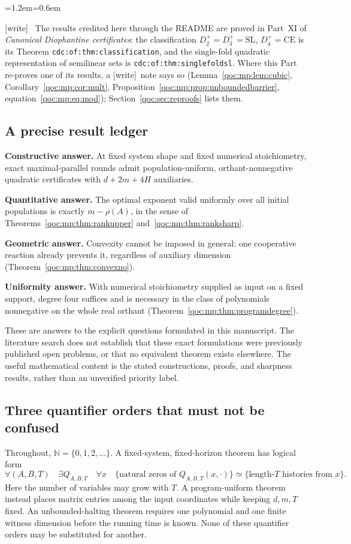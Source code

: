 \documentclass[11pt,letterpaper]{article}
\theoremstyle{definition}
\theoremstyle{remark}
\newcommand{\N}{\mathbb N}
\newcommand{\wtag}{\textup{[write]}}
\newenvironment{writenote}{\par\smallskip\begin{list}{}{\leftmargin=1.2em\rightmargin=0.6em}\item[]\small\wtag\ }{\end{list}\smallskip}
\newcommand{\lab}[1]{\nolinkurl{#1}}
\newcommand{\Dplus}{D^{+}}
\begin{document}
\begin{writenote}
The results credited here through the README are proved in Part~XI of \emph{Canonical Diophantine certificates}: the classification $\Dplus_2=\Dplus_3=\mathrm{SL}$, $\Dplus_4=\mathrm{CE}$ is its Theorem \lab{cdc:of:thm:classification}, and the single-fold quadratic representation of semilinear sets is \lab{cdc:of:thm:singlefoldsl}. Where this Part re-proves one of its results, a \wtag\ note says so (Lemma~\ref{qoc:mp:lem:cubic}, Corollary~\ref{qoc:mp:cor:mult}, Proposition~\ref{qoc:mp:prop:unboundedbarrier}, equation~\eqref{qoc:mp:eq:mod}); Section~\ref{qoc:sec:reproofs} lists them.
\end{writenote}

\subsection{A precise result ledger}
\begin{resultbox}
\textbf{Constructive answer.} At fixed system shape and fixed numerical
stoichiometry, exact maximal-parallel rounds admit population-uniform,
orthant-nonnegative quadratic certificates with $d+2m+4H$ auxiliaries.

\textbf{Quantitative answer.} The optimal exponent valid uniformly over
all initial populations is exactly $m-\rho(A)$, in the sense of
Theorems~\ref{qoc:mp:thm:rankupper} and~\ref{qoc:mp:thm:ranksharp}.

\textbf{Geometric answer.} Convexity cannot be imposed in general: one
cooperative reaction already prevents it, regardless of auxiliary dimension
(Theorem~\ref{qoc:mp:thm:convexno}).

\textbf{Uniformity answer.} With numerical stoichiometry supplied as input
on a fixed support, degree four suffices and is necessary in the class of
polynomials nonnegative on the whole real orthant
(Theorem~\ref{qoc:mp:thm:programdegree}).
\end{resultbox}

These are answers to the explicit questions formulated in this manuscript.
The literature search does not establish that these exact formulations were
previously published open problems, or that no equivalent theorem exists
elsewhere. The useful mathematical content is the stated constructions,
proofs, and sharpness results, rather than an unverified priority label.

\subsection{Three quantifier orders that must not be confused}
Throughout, $\N=\{0,1,2,\ldots\}$. A fixed-system, fixed-horizon theorem has
logical form
\[
 \forall(A,B,T)\quad \exists Q_{A,B,T}\quad\forall x\quad
 \{
 \text{natural zeros of }Q_{A,B,T}(x,\cdot)
 \}\simeq\{\text{length-$T$ histories from }x\}.
\]
Here the number of variables may grow with $T$. A program-uniform theorem
instead places matrix entries among the input coordinates while keeping
$d,m,T$ fixed. An unbounded-halting theorem requires one polynomial and
one finite witness dimension before the running time is known. None of
these quantifier orders may be substituted for another.
\end{document}
